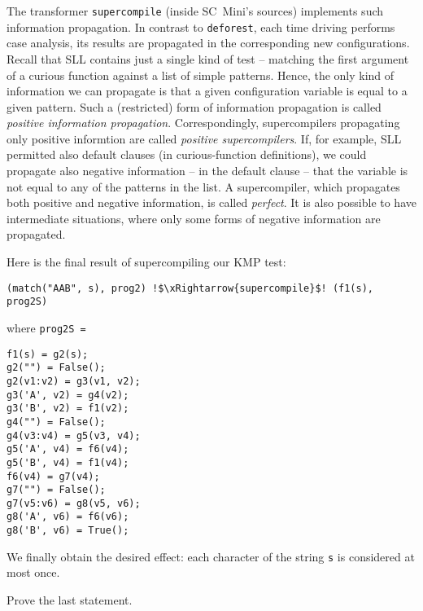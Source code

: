 The transformer \texttt{supercompile} (inside SC~Mini's sources) implements such information propagation.
In contrast to \texttt{deforest}, each time driving performs case analysis,
its results are propagated in the corresponding new configurations.
Recall that SLL contains just a single kind of test -- matching the first argument of 
a curious function against a list of simple patterns.
Hence, the only kind of information we can propagate is that
a given configuration variable is equal to a given pattern.
Such a (restricted) form of information propagation is 
called \emph{positive information propagation}.
Correspondingly, supercompilers propagating only positive informtion
are called \emph{positive supercompilers}.
If, for example, SLL permitted also default clauses
(in curious-function definitions), we could propagate 
also negative information -- in the default clause -- that
the variable is not equal to any of the patterns in the list.
A supercompiler, which propagates both positive and negative information,
is called \emph{perfect}. It is also possible to have intermediate 
situations, where only some forms of negative information are propagated.

Here is the final result of supercompiling our KMP test:
\begin{lstlisting}[language=sll,escapechar=!]
(match("AAB", s), prog2) !$\xRightarrow{supercompile}$! (f1(s), prog2S)
\end{lstlisting}
where \texttt{prog2S = }
\begin{lstlisting}[language=sll]
f1(s) = g2(s);
g2("") = False();
g2(v1:v2) = g3(v1, v2);
g3('A', v2) = g4(v2);
g3('B', v2) = f1(v2);
g4("") = False();
g4(v3:v4) = g5(v3, v4);
g5('A', v4) = f6(v4);
g5('B', v4) = f1(v4);
f6(v4) = g7(v4);
g7("") = False();
g7(v5:v6) = g8(v5, v6);
g8('A', v6) = f6(v6);
g8('B', v6) = True();
\end{lstlisting}

We finally obtain the desired effect: each character of the string \texttt{s}
is considered at most once.

\begin{exercise}
Prove the last statement.
\end{exercise}

